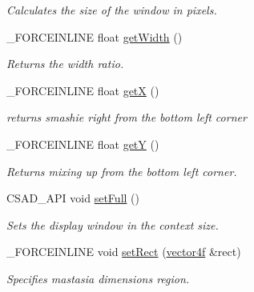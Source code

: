 \begin{DoxyCompactItemize}
\begin{DoxyCompactList}\small\item\em Calculates the size of the window in pixels. \end{DoxyCompactList}\item 
\hypertarget{classcsad_1_1_view_port_a1d81274639278eff0d772a3fcd88c158}{\-\_\-\-F\-O\-R\-C\-E\-I\-N\-L\-I\-N\-E float \hyperlink{classcsad_1_1_view_port_a1d81274639278eff0d772a3fcd88c158}{get\-Width} ()}\label{classcsad_1_1_view_port_a1d81274639278eff0d772a3fcd88c158}

\begin{DoxyCompactList}\small\item\em Returns the width ratio. \end{DoxyCompactList}\item 
\hypertarget{classcsad_1_1_view_port_a8f0a6967461ee52e79244b7620b09a8a}{\-\_\-\-F\-O\-R\-C\-E\-I\-N\-L\-I\-N\-E float \hyperlink{classcsad_1_1_view_port_a8f0a6967461ee52e79244b7620b09a8a}{get\-X} ()}\label{classcsad_1_1_view_port_a8f0a6967461ee52e79244b7620b09a8a}

\begin{DoxyCompactList}\small\item\em returns smashie right from the bottom left corner \end{DoxyCompactList}\item 
\hypertarget{classcsad_1_1_view_port_aee352c063a3c329b71ed3e66433608d6}{\-\_\-\-F\-O\-R\-C\-E\-I\-N\-L\-I\-N\-E float \hyperlink{classcsad_1_1_view_port_aee352c063a3c329b71ed3e66433608d6}{get\-Y} ()}\label{classcsad_1_1_view_port_aee352c063a3c329b71ed3e66433608d6}

\begin{DoxyCompactList}\small\item\em Returns mixing up from the bottom left corner. \end{DoxyCompactList}\item 
\hypertarget{classcsad_1_1_view_port_a756ec12d5be881ab6ce01d686d3d09f5}{C\-S\-A\-D\-\_\-\-A\-P\-I void \hyperlink{classcsad_1_1_view_port_a756ec12d5be881ab6ce01d686d3d09f5}{set\-Full} ()}\label{classcsad_1_1_view_port_a756ec12d5be881ab6ce01d686d3d09f5}

\begin{DoxyCompactList}\small\item\em Sets the display window in the context size. \end{DoxyCompactList}\item 
\hypertarget{classcsad_1_1_view_port_aef7148d13aecabbaab7530fb273c5797}{\-\_\-\-F\-O\-R\-C\-E\-I\-N\-L\-I\-N\-E void \hyperlink{classcsad_1_1_view_port_aef7148d13aecabbaab7530fb273c5797}{set\-Rect} (\hyperlink{classbt_1_1vector4f}{vector4f} \&rect)}\label{classcsad_1_1_view_port_aef7148d13aecabbaab7530fb273c5797}

\begin{DoxyCompactList}\small\item\em Specifies mastasia dimensions region. \end{DoxyCompactList}\end{DoxyCompactItemize}


